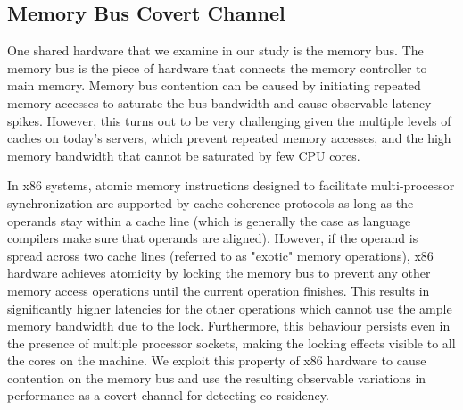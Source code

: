
\subsection{Memory Bus Covert Channel}
\label{sec:background:membus}
One shared hardware that we examine in our study is the memory bus. The memory bus is the piece of hardware that connects the memory controller to main memory. Memory bus contention can be caused by initiating repeated memory accesses to saturate the bus bandwidth and cause observable latency spikes. However, this turns out to be very challenging given the multiple levels of caches on today's servers, which prevent repeated memory accesses, and the high memory bandwidth that cannot be saturated by few CPU cores. 

In x86 systems, atomic memory instructions designed to facilitate multi-processor synchronization are supported by cache coherence protocols as long as the operands stay within a cache line (which is generally the case as language compilers make sure that operands are aligned). However, if the operand is spread across two cache lines (referred to as "exotic" memory operations), x86 hardware achieves atomicity by locking the memory bus to prevent any other memory access operations until the current operation finishes. This
 results in significantly higher latencies for the other operations
 which cannot use the ample memory bandwidth due to the lock\cite{wuusenix2012}. Furthermore, this behaviour persists even in the presence of multiple processor sockets, making the locking effects visible to all the cores on the machine. We exploit this property of x86 hardware to cause contention on the memory bus and use the 
 resulting observable variations in performance as a covert channel for detecting co-residency. 
